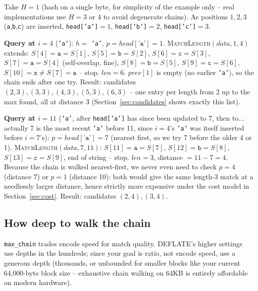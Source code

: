 \documentclass[11pt]{article}
\begin{document}
\begin{tcolorbox}[colback=green!5!white,colframe=green!45!black,title=Worked example: two hash-chain lookups on $S$]
Take $H{=}1$ (hash on a single byte, for simplicity of the example only -- real
implementations use $H{=}3$ or $4$ to avoid degenerate chains). As positions $1,2,3$
(\texttt{a},\texttt{b},\texttt{c}) are inserted, \texttt{head['a']}$=1$,
\texttt{head['b']}$=2$, \texttt{head['c']}$=3$.

\textbf{Query at $i=4$} (\texttt{'a'}): $h=$ \texttt{'a'}, $p = head[\texttt{'a'}] = 1$.
\textsc{MatchLength}$(data, 1, 4)$ extends: $S[4]{=}\texttt{a}{=}S[1]$,
$S[5]{=}\texttt{b}{=}S[2]$, $S[6]{=}\texttt{c}{=}S[3]$, $S[7]{=}\texttt{a}{=}S[4]$
(self-overlap, fine), $S[8]{=}\texttt{b}{=}S[5]$, $S[9]{=}\texttt{c}{=}S[6]$,
$S[10]{=}\texttt{x}\ne S[7]{=}\texttt{a}$ -- stop. $len = 6$. $prev[1]$ is empty (no
earlier \texttt{'a'}), so the chain ends after one try. Result: candidates
$(2,3),(3,3),(4,3),(5,3),(6,3)$ -- one entry per length from 2 up to the max found, all
at distance 3 (Section~\ref{sec:candidates} shows exactly this list).

\textbf{Query at $i=11$} (\texttt{'a'}, after \texttt{head['a']} has since been updated
to 7, then to... actually 7 is the most recent \texttt{'a'} before 11, since $i=4$'s
\texttt{'a'} was itself inserted before $i=7$'s): $p = head[\texttt{'a'}] = 7$ (nearest
first, so we try 7 before the older 4 or 1). \textsc{MatchLength}$(data, 7, 11)$:
$S[11]{=}\texttt{a}{=}S[7]$, $S[12]{=}\texttt{b}{=}S[8]$, $S[13]{=}\texttt{c}{=}S[9]$,
end of string -- stop. $len=3$, distance $=11-7=4$. Because the chain is walked
nearest-first, we never even need to check $p=4$ (distance 7) or $p=1$ (distance 10):
both would give the same length-3 match at a needlessly larger distance, hence strictly
more expensive under the cost model in Section~\ref{sec:cost}. Result: candidates
$(2,4),(3,4)$.
\end{tcolorbox}

\subsection{How deep to walk the chain}

\texttt{max\_chain} trades encode speed for match quality. DEFLATE's higher settings use
depths in the hundreds; since your goal is ratio, not encode speed, use a generous depth
(thousands, or unbounded for smaller blocks like your current 64{,}000-byte block size --
exhaustive chain walking on 64KB is entirely affordable on modern hardware).
\end{document}
